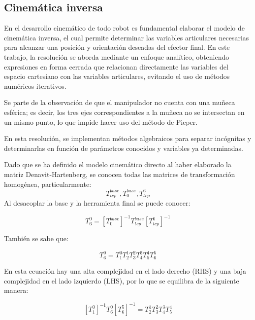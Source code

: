 \documentclass{article}
\begin{document}
%
%
\subsection{Cinemática inversa}
\label{sec:cinematica_inversa}

En el desarrollo cinemático de todo robot es fundamental elaborar el modelo de cinemática inversa, el cual permite determinar las variables articulares necesarias para alcanzar una posición y orientación deseadas del efector final. En este trabajo, la resolución se aborda mediante un enfoque analítico, obteniendo expresiones en forma cerrada que relacionan directamente las variables del espacio cartesiano con las variables articulares, evitando el uso de métodos numéricos iterativos.

Se parte de la observación de que el manipulador no cuenta con una muñeca esférica; es decir, los tres ejes correspondientes a la muñeca no se intersectan en un mismo punto, lo que impide hacer uso del método de Pieper.

En esta resolución, se implementan métodos algebraicos para separar incógnitas y determinarlas en función de parámetros conocidos y variables ya determinadas.

Dado que se ha definido el modelo cinemático directo al haber elaborado la matriz Denavit-Hartenberg, se conocen todas las matrices de transformación homogénea, particularmente:
\begin{equation}
    T^{base}_{tcp}, T^{base}_0, T^6_{tcp}
\end{equation}
Al desacoplar la base y la herramienta final se puede conocer:

\begin{equation}
\label{eq:ci_desacople}
    T^0_6=[T^{base}_0]^{-1}T^{base}_{tcp}[T^6_{tcp}]^{-1}
\end{equation}

También se sabe que:

\begin{equation}
    T^0_6=T^0_1T^1_2T^2_3T^3_4T^4_5T^5_6
\end{equation}

En esta ecuación hay una alta complejidad en el lado derecho (RHS) y una baja complejidad en el lado izquierdo (LHS), por lo que se equilibra de la siguiente manera:

\begin{equation}
    \label{eq:ci_1}
    [T^0_1]^{-1}T^0_6[T^5_6]^{-1} = T^1_2T^2_3T^3_4T^4_5
\end{equation}
\end{document}
